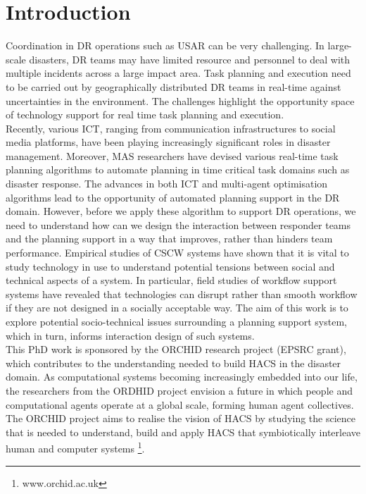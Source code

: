 \chapter{Introduction}\label{ch:introduction}
Coordination in \acf{DR} operations such as \acf{USAR} can be very challenging. In large-scale disasters, \ac{DR} teams may have limited resource and personnel to deal with multiple incidents across a large impact area. Task planning and execution need to be carried out by geographically distributed \ac{DR} teams in real-time against uncertainties in the environment. The challenges highlight the opportunity space of technology support for real time task planning and execution.  \\ 

Recently, various \acf{ICT}, ranging from communication infrastructures to social media platforms, have been playing increasingly significant roles in  disaster management.  Moreover, \acf{MAS} researchers have devised various real-time task planning algorithms to automate planning in time critical task domains such as disaster response. The advances in both \ac{ICT} and multi-agent optimisation algorithms lead to the opportunity of automated planning support in the \ac{DR} domain. However, before we apply these algorithm to support \ac{DR} operations, we need to understand how can we design the interaction between responder teams and the planning support in a way that improves, rather than hinders team performance. Empirical studies of \acf{CSCW} systems have shown that it is vital to study technology in use to understand potential tensions between social and technical aspects of a system. In particular, field studies of workflow support systems have revealed that technologies can disrupt rather than smooth workflow if they are not designed in a socially acceptable way. The aim of this work is to explore potential socio-technical issues surrounding a planning support system, which in turn, informs interaction design of such systems. \\

This PhD work is sponsored by the ORCHID research project (EPSRC grant), which contributes to the understanding needed to build \acf{HACS} in the disaster domain. As computational systems  becoming increasingly embedded into our life, the researchers from the ORDHID project envision a future in which people and computational agents operate at a global scale, forming human agent collectives. The ORCHID project aims to realise the vision of \ac{HACS} by studying the science that is needed to understand, build and apply \ac{HACS} that symbiotically interleave human and computer systems \footnote{www.orchid.ac.uk}.\\

